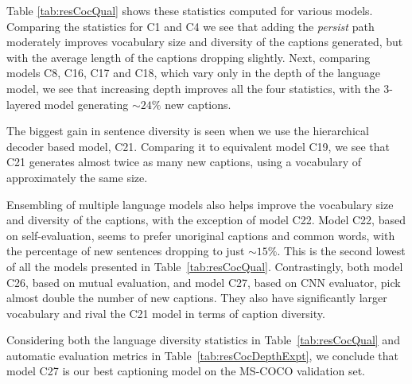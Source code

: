 Table \ref{tab:resCocQual} shows these statistics computed for various
models. 
Comparing the statistics for C1 and C4 we see that adding the \emph{persist} path
moderately improves vocabulary size and diversity of the captions generated,
but with the average length of the captions dropping slightly.
Next, comparing models C8, C16, C17 and C18, which vary only in the depth of the
language model, we see that increasing depth improves all the four statistics,
with the 3-layered model generating $\sim24\%$ new captions.

The biggest gain in sentence diversity is seen when we use the hierarchical
decoder based model, C21. 
Comparing it to equivalent model C19, we see that C21 generates almost twice as
many new captions, using a vocabulary of approximately the same size.

Ensembling of multiple language models also helps improve the vocabulary size
and diversity of the captions, with the exception of model C22.
Model C22, based on self-evaluation, seems to prefer unoriginal captions and
common words, with the percentage of new sentences dropping to just $\sim15\%$.
This is the second lowest of all the models presented in
Table~\ref{tab:resCocQual}.
Contrastingly, both model C26, based on mutual evaluation, and model C27, based on CNN
evaluator, pick almost double the number of new captions.
They also have significantly larger vocabulary and rival the C21 model in
terms of caption diversity.

Considering both the language diversity statistics in Table~\ref{tab:resCocQual}
and automatic evaluation metrics in Table~\ref{tab:resCocDepthExpt}, we conclude
that model C27 is our best captioning model on the MS-COCO validation set.
